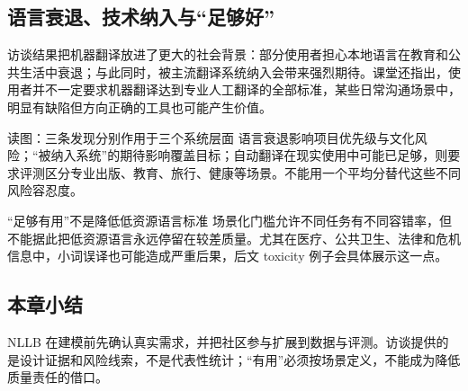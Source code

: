 
\subsection{语言衰退、技术纳入与“足够好”}

访谈结果把机器翻译放进了更大的社会背景：部分使用者担心本地语言在教育和公共生活中衰退；与此同时，被主流翻译系统纳入会带来强烈期待。课堂还指出，使用者并不一定要求机器翻译达到专业人工翻译的全部标准，某些日常沟通场景中，明显有缺陷但方向正确的工具也可能产生价值。


\begin{knowledgebox}{读图：三条发现分别作用于三个系统层面}
语言衰退影响项目优先级与文化风险；“被纳入系统”的期待影响覆盖目标；自动翻译在现实使用中可能已足够，则要求评测区分专业出版、教育、旅行、健康等场景。不能用一个平均分替代这些不同风险容忍度。
\end{knowledgebox}

\begin{warningbox}{“足够有用”不是降低低资源语言标准}
场景化门槛允许不同任务有不同容错率，但不能据此把低资源语言永远停留在较差质量。尤其在医疗、公共卫生、法律和危机信息中，小词误译也可能造成严重后果，后文 toxicity 例子会具体展示这一点。
\end{warningbox}


\subsection{本章小结}

NLLB 在建模前先确认真实需求，并把社区参与扩展到数据与评测。访谈提供的是设计证据和风险线索，不是代表性统计；“有用”必须按场景定义，不能成为降低质量责任的借口。

